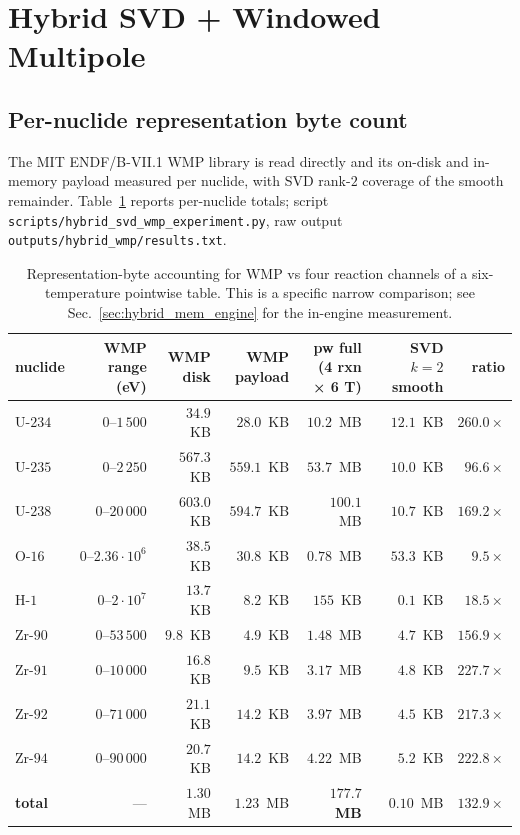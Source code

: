 \section{Hybrid SVD + Windowed Multipole}
\label{sec:hybrid}

\subsection{Per-nuclide representation byte count}
\label{sec:hybrid_mem}

The MIT ENDF/B-VII.1 WMP library is read directly and its
on-disk and in-memory payload measured per nuclide, with
SVD rank-$2$ coverage of the smooth remainder.
Table~\ref{tab:hybrid_mem} reports per-nuclide totals; script
\texttt{scripts/hybrid\_svd\_wmp\_experiment.py}, raw output
\texttt{outputs/hybrid\_wmp/results.txt}.

\begin{table}[t]
\centering
\caption{Representation-byte accounting for WMP vs four
reaction channels of a six-temperature pointwise table. This
is a specific narrow comparison; see
Sec.~\ref{sec:hybrid_mem_engine} for the in-engine measurement.}
\label{tab:hybrid_mem}
\begin{tabular}{@{}lrrrrrr@{}}
\toprule
nuclide & WMP range (eV) & WMP disk & WMP payload & pw full (4 rxn × 6 T) & SVD $k{=}2$ smooth & ratio \\
\midrule
U-$234$  & $0$--$1\,500$         & $34.9$~KB  & $28.0$~KB   & $10.2$~MB  & $12.1$~KB  & $260.0\times$ \\
U-$235$  & $0$--$2\,250$         & $567.3$~KB & $559.1$~KB  & $53.7$~MB  & $10.0$~KB  & $96.6\times$ \\
U-$238$  & $0$--$20\,000$        & $603.0$~KB & $594.7$~KB  & $100.1$~MB & $10.7$~KB  & $169.2\times$ \\
O-$16$   & $0$--$2.36\cdot 10^6$ & $38.5$~KB  & $30.8$~KB   & $0.78$~MB  & $53.3$~KB  & $9.5\times$ \\
H-$1$    & $0$--$2\cdot 10^7$    & $13.7$~KB  & $8.2$~KB    & $155$~KB   & $0.1$~KB   & $18.5\times$ \\
Zr-$90$  & $0$--$53\,500$        & $9.8$~KB   & $4.9$~KB    & $1.48$~MB  & $4.7$~KB   & $156.9\times$ \\
Zr-$91$  & $0$--$10\,000$        & $16.8$~KB  & $9.5$~KB    & $3.17$~MB  & $4.8$~KB   & $227.7\times$ \\
Zr-$92$  & $0$--$71\,000$        & $21.1$~KB  & $14.2$~KB   & $3.97$~MB  & $4.5$~KB   & $217.3\times$ \\
Zr-$94$  & $0$--$90\,000$        & $20.7$~KB  & $14.2$~KB   & $4.22$~MB  & $5.2$~KB   & $222.8\times$ \\
\midrule
\textbf{total} & --- & $1.30$~MB & $1.23$~MB & $\mathbf{177.7}$~\textbf{MB} & $0.10$~MB & $\mathbf{132.9\times}$ \\
\bottomrule
\end{tabular}
\end{table}

